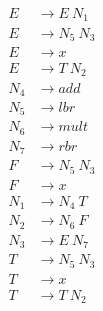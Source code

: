 \begin{align*}
E &\rightarrow E\ N_1 \\
E &\rightarrow N_5\ N_3 \\
E &\rightarrow x \\
E &\rightarrow T\ N_2 \\
N_4 &\rightarrow add \\
N_5 &\rightarrow lbr \\
N_6 &\rightarrow mult \\
N_7 &\rightarrow rbr \\
F &\rightarrow N_5\ N_3 \\
F &\rightarrow x \\
N_1 &\rightarrow N_4\ T \\
N_2 &\rightarrow N_6\ F \\
N_3 &\rightarrow E\ N_7 \\
T &\rightarrow N_5\ N_3 \\
T &\rightarrow x \\
T &\rightarrow T\ N_2 \\
\end{align*}